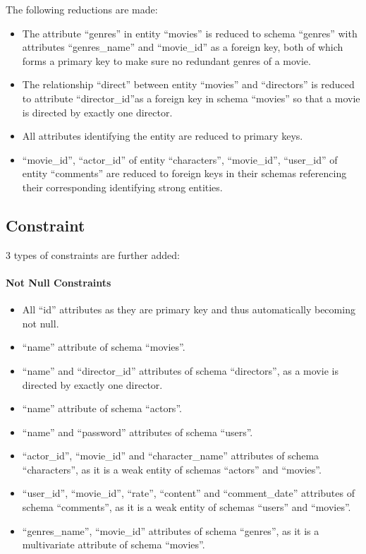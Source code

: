 \begin{CJK*}{UTF8}{gbsn}
The following reductions are made:
\begin{itemize}
\item The attribute ``genres'' in entity ``movies'' is reduced to schema ``genres'' with attributes ``genres\_name'' and ``movie\_id'' as a foreign key, both of which forms a primary key to make sure no redundant genres of a movie.
\item The relationship ``direct'' between entity ``movies'' and ``directors'' is reduced to attribute ``director\_id''as a foreign key in schema ``movies'' so that a movie is directed by exactly one director. 
\item All attributes identifying the entity are reduced to primary keys.
\item ``movie\_id'', ``actor\_id'' of entity ``characters'', ``movie\_id'', ``user\_id'' of entity ``comments'' are reduced to foreign keys in their schemas referencing their corresponding identifying strong entities. 
\end{itemize}

\subsection{Constraint}
3 types of constraints are further added:
\paragraph{Not Null Constraints}
\begin{itemize}
\item All ``id'' attributes as they are primary key and thus automatically becoming not null.
\item ``name'' attribute of schema ``movies''.
\item ``name'' and ``director\_id'' attributes of schema ``directors'', as a movie is directed by exactly one director.
\item ``name'' attribute of schema ``actors''.
\item ``name'' and ``password'' attributes of schema ``users''.
\item ``actor\_id'', ``movie\_id'' and ``character\_name'' attributes of schema ``characters'', as it is a weak entity of schemas ``actors'' and ``movies''.
\item ``user\_id'', ``movie\_id'', ``rate'', ``content'' and ``comment\_date'' attributes of schema ``comments'', as it is a weak entity of schemas ``users'' and ``movies''.
\item ``genres\_name'', ``movie\_id'' attributes of schema ``genres'', as it is a multivariate attribute of schema ``movies''.
\end{itemize}

\end{CJK*}
